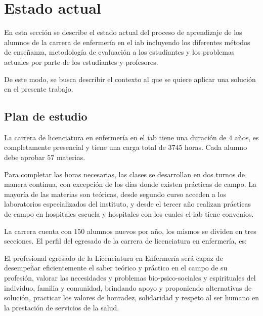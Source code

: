 
\section{Estado actual}

En esta sección se describe el estado actual del proceso de aprendizaje de los 
alumnos de la carrera de enfermería en el \Gls{iab} incluyendo los diferentes 
métodos de enseñanza, metodología de evaluación a los estudiantes 
y los problemas actuales por parte de los estudiantes y profesores.

De este modo, se busca describir el contexto al que se quiere aplicar una 
solución en el presente trabajo.


\subsection{Plan de estudio}
\label{sec:plan_estudio}

La carrera de licenciatura en enfermería en el \Gls{iab} tiene una duración de $4$
años, es completamente presencial y tiene una carga total de $3745$
horas. Cada alumno debe aprobar $57$ materias.

Para completar las horas necesarias, las clases se desarrollan en 
dos turnos de manera continua, con excepción de los días donde existen
prácticas de campo. La mayoría de las materias son teóricas, desde segundo curso
acceden a los laboratorios especializados del instituto, y desde el tercer año
realizan prácticas de campo en hospitales escuela y hospitales con los cuales el
\Gls{iab} tiene convenios.

La carrera cuenta con $150$ alumnos nuevos por año, los mismos se dividen en tres secciones. 
El perfil del egresado de la carrera de licenciatura en enfermería,
es\cite{iab:enfermeria}:

\begin{displayquote}

El profesional egresado de la Licenciatura en Enfermería será capaz de
desempeñar eficientemente el saber teórico y práctico en el campo de su
profesión, valorar las necesidades y problemas bio-psico-sociales y espirituales
del individuo, familia y comunidad, brindando apoyo y proponiendo alternativas
de solución, practicar los valores de honradez, solidaridad y respeto al ser
humano en la prestación de servicios de la salud.

\end{displayquote}

